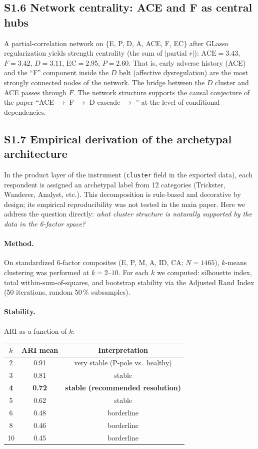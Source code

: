 \subsection*{S1.6 Network centrality: ACE and F as central hubs}
A partial-correlation network on $\{$E, P, D, A, ACE, F, EC$\}$ after GLasso regularization yields strength centrality (the sum of $|$partial $r|$): $\mathrm{ACE} = 3.43$, $F = 3.42$, $D = 3.11$, $\mathrm{EC} = 2.95$, $P = 2.60$. That is, early adverse history (ACE) and the ``F'' component inside the $D$ belt (affective dysregulation) are the most strongly connected nodes of the network. The bridge between the $D$ cluster and ACE passes through $F$. The network structure supports the causal conjecture of the paper ``ACE $\to$ F $\to$ D-cascade $\to$ \EAF{}'' at the level of conditional dependencies.

\subsection*{S1.7 Empirical derivation of the archetypal architecture}
\label{supp:empirical_archetypes}

In the product layer of the instrument (\texttt{cluster} field in the exported data), each respondent is assigned an archetypal label from 12 categories (Trickster, Wanderer, Analyst, etc.). This decomposition is rule-based and decorative by design; its empirical reproducibility was not tested in the main paper. Here we address the question directly: \emph{what cluster structure is naturally supported by the data in the 6-factor space?}

\paragraph{Method.} On standardized 6-factor composites (E, P, M, A, ID, CA; $N = 1465$), $k$-means clustering was performed at $k = 2$--$10$. For each $k$ we computed: silhouette index, total within-sum-of-squares, and bootstrap stability via the Adjusted Rand Index (50 iterations, random 50\,\% subsamples).

\paragraph{Stability.} ARI as a function of $k$:

\begin{center}
\begin{tabular}{ccc}
\toprule
$k$ & ARI mean & Interpretation \\
\midrule
2 & 0.91 & very stable (P-pole vs.\ healthy) \\
3 & 0.81 & stable \\
\textbf{4} & \textbf{0.72} & \textbf{stable (recommended resolution)} \\
5 & 0.62 & stable \\
6 & 0.48 & borderline \\
8 & 0.46 & borderline \\
10 & 0.45 & borderline \\
\bottomrule
\end{tabular}
\end{center}

